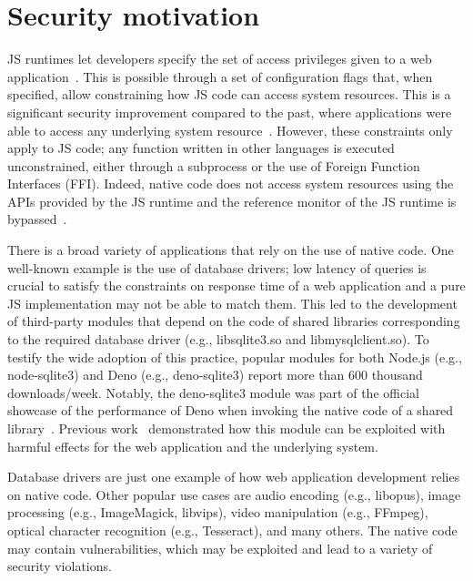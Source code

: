 \section{Security motivation}
\label{sect:sci-ffi}

JS runtimes let developers specify the set of access privileges given
to a web application~\cite{deno-permissions, node-permissions}.  This
is possible through a set of configuration flags that, when specified,
allow constraining how JS code can access system resources.  This is a
significant security improvement compared to the past, where
applications were able to access any underlying system
resource~\cite{staicu2018synode, zimmermann-risks}.  However,
these constraints only apply to JS code; any function written in other
languages is executed unconstrained, either through a subprocess or
the use of Foreign Function Interfaces (FFI).  Indeed, native code
does not access system resources using the APIs provided by the JS
runtime and the reference monitor of the JS runtime is
bypassed~\cite{deno-permissions}.

There is a broad variety of applications that rely on the use of
native code.  One well-known example is the use of database drivers;
low latency of queries is crucial to satisfy the constraints on
response time of a web application and a pure JS implementation may
not be able to match them. This led to the development of third-party
modules that depend on the code of shared libraries corresponding to
the required database driver (e.g., libsqlite3.so and
libmysqlclient.so).  To testify the wide adoption of this practice,
popular modules for both Node.js (e.g.,
node-sqlite3) and Deno (e.g.,
deno-sqlite3) report more than 600 thousand
\mbox{downloads/week}. Notably, the deno-sqlite3 module was part of
the official showcase of the performance of Deno when invoking the
native code of a shared library~\cite{deno-ffi-improvements}. Previous
work~\cite{staicu2021bilingual} demonstrated how this module can be
exploited with harmful effects for the web application and the
underlying system.

Database drivers are just one example of how web application
development relies on native code.  Other popular use cases are audio
encoding (e.g., libopus), image processing (e.g., ImageMagick,
libvips), video manipulation (e.g., FFmpeg), optical character
recognition (e.g., Tesseract), and many others.  The native code may
contain vulnerabilities, which may be exploited and lead to a variety
of security violations.

